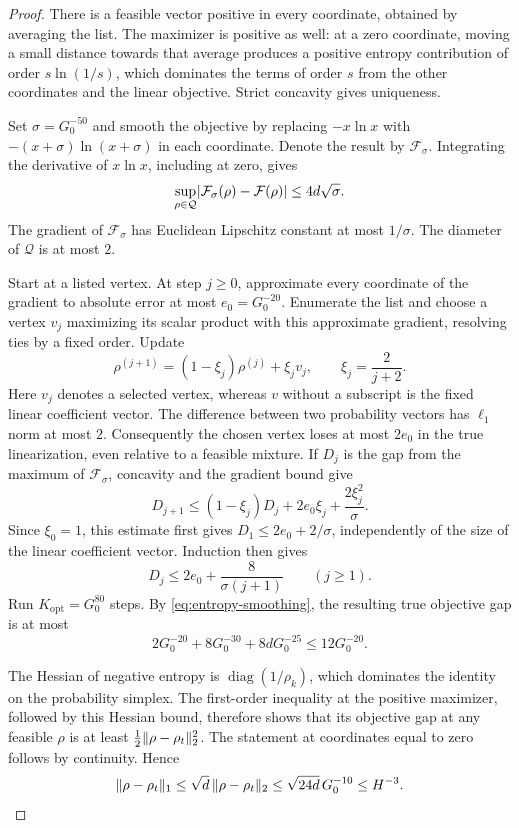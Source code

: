 \begin{proof}
There is a feasible vector positive in every coordinate, obtained by
averaging the list.  The maximizer is positive as well: at a zero
coordinate, moving a small distance towards that average produces a
positive entropy contribution of order $s\ln(1/s)$, which dominates
the terms of order $s$ from the other coordinates and the linear
objective.  Strict concavity gives uniqueness.

Set $\sigma=G_0^{-50}$ and smooth the objective by replacing
$-x\ln x$ with $-(x+\sigma)\ln(x+\sigma)$ in each coordinate.  Denote
the result by $\mathcal F_\sigma$.  Integrating the derivative of
$x\ln x$, including at zero, gives
\begin{equation}
 \sup_{\rho\in\mathcal Q}
 \lvert\mathcal F_\sigma(\rho)-\mathcal F(\rho)\rvert
 \le 4d\sqrt\sigma.
 \label{eq:entropy-smoothing}
\end{equation}
The gradient of $\mathcal F_\sigma$ has Euclidean Lipschitz constant
at most $1/\sigma$.  The diameter of $\mathcal Q$ is at most $2$.

Start at a listed vertex.  At step $j\ge0$, approximate every coordinate
of the gradient to absolute error at most $e_0=G_0^{-20}$.  Enumerate
the list and choose a vertex $v_j$ maximizing its scalar product with
this approximate gradient, resolving ties by a fixed order.  Update
\[
 \rho^{(j+1)}=(1-\xi_j)\rho^{(j)}+\xi_j v_j,
 \qquad \xi_j=\frac{2}{j+2}.
\]
Here $v_j$ denotes a selected vertex, whereas $v$ without a subscript
is the fixed linear coefficient vector.  The difference between two
probability vectors has $\ell_1$ norm at most $2$.  Consequently the
chosen vertex loses at most $2e_0$ in the true linearization, even
relative to a feasible mixture.  If $D_j$ is the gap from the maximum
of $\mathcal F_\sigma$, concavity and the gradient bound give
\begin{equation}
 D_{j+1}\le(1-\xi_j)D_j+2e_0\xi_j+
                  \frac{2\xi_j^2}{\sigma}.
 \label{eq:finite-optimizer-recursion}
\end{equation}
Since $\xi_0=1$, this estimate first gives
$D_1\le2e_0+2/\sigma$, independently of the size of the linear
coefficient vector.  Induction then gives
\[
 D_j\le2e_0+\frac{8}{\sigma(j+1)}\qquad(j\ge1).
\]
Run $K_{\mathrm{opt}}=G_0^{80}$ steps.  By
\eqref{eq:entropy-smoothing}, the resulting true objective gap is at
most
\[
 2G_0^{-20}+8G_0^{-30}+8dG_0^{-25}
 \le12G_0^{-20}.
\]

The Hessian of negative entropy is
$\operatorname{diag}(1/\rho_k)$, which dominates the identity on the
probability simplex.  The first-order inequality at the positive
maximizer, followed by this Hessian bound, therefore shows that its
objective gap at any feasible $\rho$ is at least
$\frac12\lVert\rho-\rho_t\rVert_2^2$.  The statement at coordinates equal
to zero follows by continuity.  Hence
\[
 \lVert\rho-\rho_t\rVert_1
 \le\sqrt d\,\lVert\rho-\rho_t\rVert_2
 \le\sqrt{24d}\,G_0^{-10}\le H^{-3}.
\]


\end{proof}

